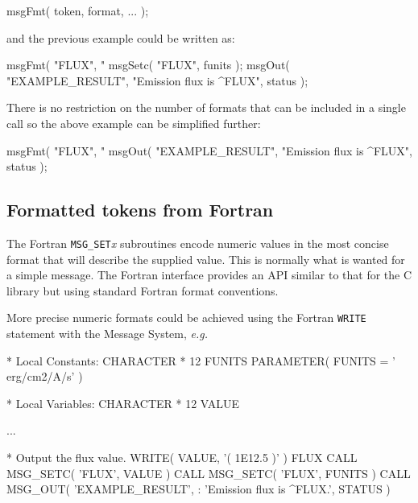 \documentclass[twoside,11pt]{starlink}
\providecommand{\func}[1]{\texttt{#1}}
\begin{document}
\begin{small}
\begin{terminalv}
msgFmt( token, format, ... );
\end{terminalv}
\end{small}

and the previous example could be written as:

\begin{small}
\begin{terminalv}
msgFmt( "FLUX", "%
msgSetc( "FLUX", funits );
msgOut( "EXAMPLE_RESULT",
       "Emission flux is ^FLUX", status );
\end{terminalv}
\end{small}

There is no restriction on the number of formats that can be included
in a single call so the above example can be simplified further:

\begin{small}
\begin{terminalv}
msgFmt( "FLUX", "%
msgOut( "EXAMPLE_RESULT",
       "Emission flux is ^FLUX", status );
\end{terminalv}
\end{small}

\subsection{Formatted tokens from Fortran}

The Fortran \func{MSG\_SET}\textit{x} subroutines encode numeric values in the most concise
format that will describe the supplied value.
This is normally what is wanted for a simple message. The Fortran
interface provides an API similar to that for the C library but using
standard Fortran format conventions.

More precise numeric formats could be achieved using the Fortran \func{WRITE}
statement with the Message System, \textit{e.g.}

\begin {small}
\begin{terminalv}
*  Local Constants:
      CHARACTER * 12 FUNITS
      PARAMETER( FUNITS = ' erg/cm2/A/s' )

*  Local Variables:
      CHARACTER * 12 VALUE

      ...

*  Output the flux value.
      WRITE( VALUE, '( 1E12.5 )' ) FLUX
      CALL MSG_SETC( 'FLUX', VALUE )
      CALL MSG_SETC( 'FLUX', FUNITS )
      CALL MSG_OUT( 'EXAMPLE_RESULT',
     :             'Emission flux is ^FLUX.', STATUS )
\end{terminalv}
\end {small}
\end{document}
